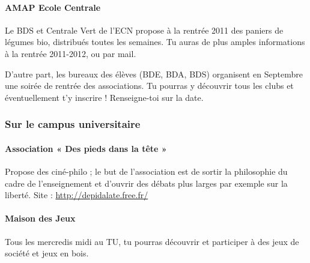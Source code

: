 \paragraph{AMAP Ecole Centrale} Le BDS et Centrale Vert de l'ECN propose à la rentrée 2011 des paniers de légumes bio, distribués toutes les semaines. Tu auras de plus amples informations à la rentrée 2011-2012, ou par mail.

D'autre part, les bureaux des élèves (BDE, BDA, BDS) organisent en Septembre une soirée de rentrée des associations. Tu pourras y découvrir tous les clubs et éventuellement t'y inscrire ! Renseigne-toi sur la date.

\subsubsection{Sur le campus universitaire}
\paragraph{Association « Des pieds dans la tête »} Propose des ciné-philo ; le but de l'association est de sortir la philosophie du cadre de l'enseignement et d'ouvrir des débats plus larges par exemple sur la liberté. Site : \url{http://depidalate.free.fr/}
\paragraph{Maison des Jeux} Tous les mercredis midi au TU, tu pourras découvrir et participer à des jeux de société et jeux en bois.
